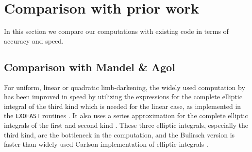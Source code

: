 \documentclass[modern]{aastex61}
\begin{document}
%
%
%
%

\section{Comparison with prior work} \label{sec:comparison}

In this section we compare our computations with existing code in terms
of accuracy and speed.

\subsection{Comparison with Mandel \& Agol}

For uniform, linear or quadratic limb-darkening, the widely used computation
by \citet{MandelAgol2002} has been improved in speed by utilizing the
\citet{Bulirsch1965a,Bulirsch1965b} expressions for the complete elliptic
integral of the third kind which is needed for the linear case, as implemented
in the \texttt{EXOFAST} routines \citep{Eastman2013}.  It also uses a series 
approximation for the complete elliptic integrals of the first and second 
kind \citep{Hastings1955}. These three elliptic integrals, especially the third
kind, are the bottleneck in the computation, and the Bulirsch version is faster
than widely used Carlson implementation of elliptic integrals \citep{Carlson1979}.
\end{document}
